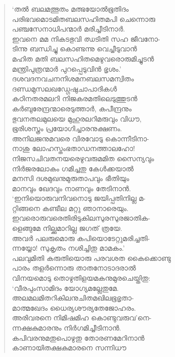 \begin{verse}
‘തല്‍ ബലമത്ഭുതം മത്ഭയോല്‍ഭൂതിദം\\
പരിഭവമൊടമിതബലസഹിതമപി ചെന്നൊരു\\
പഞ്ചസേനാധിപന്മാര്‍ മരിച്ചീടിനാര്‍.\\
ഇവനെ മമ നികടഭുവി ഝടിതി സഹ ജീവനോ-\\
ടിന്നു ബന്ധിച്ചു കൊണ്ടന്നു വെച്ചീടുവാന്‍\\
മഹിത മതി ബലസഹിതമെഴുവരൊരുമിച്ചുടന്‍\\
മന്ത്രിപുത്രന്മാര്‍ പുറപ്പെടുവിന്‍ ഭൃശം.’\\
ദശവദനവചനനിശമനബലസമന്വിതം\\
ദണ്ഡമുസലഖഡ്ഗേഷുചാപാദികള്‍\\
കഠിനതരമലറി നിജകരമതിലെടുത്തുടന്‍\\
കര്‍ബുരേന്ദ്രന്മാരെടുത്താര്‍, കപീന്ദ്രനും\\
ഭുവനതലമുലയെ മുഹുരലറിമരുവും വിധൗ,\\
ഭൂരിശസ്ത്രം പ്രയോഗിച്ചാരനുക്ഷണം.\\
അനിലജനുമവരെ വിരവോടു കൊന്നീടിനാ-\\
നാശു ലോഹസ്തംഭതാഡനത്താലഹോ!\\
നിജസചിവതനയരെഴുവരുമമിത സൈന്യവും\\
നിര്‍ജരലോകം ഗമിച്ചതു കേള്‍ക്കയാല്‍\\
മനസി ദശമുഖനുമുരുതാപവും ഭീതിയും\\
മാനവും ഖേദവും നാണവും തേടിനാന്‍.\\
‘ഇനിയൊരുവനിവനൊടു ജയിപ്പതിനില്ല മ-\\
റ്റിങ്ങനെ കണ്ടീല മറ്റു ഞാനാരെയും.\\
ഇവരൊരുവരെതിരിടുകിലസുരസുരജാതിക-\\
ളെങ്ങുമേ നില്ക്കുമാറില്ല ജഗത് ത്രയേ.\\
അവര്‍ പലരുമൊരു കപിയൊടേറ്റുമരിച്ചതി-\\
ന്നയ്യോ! സുകൃതം നശിച്ചിതു മാമകം.’\\
പലവുമിതി കരുതിയൊരു പരവശത കൈക്കൊണ്ടു\\
പാരം തളര്‍ന്നൊരു താതനോടാദരാല്‍\\
വിനയമൊടു തൊഴുതിളയമകനുമുരചെയ്തിതു:\\
‘വീരപുംസാമിദം യോഗ്യമല്ലേതുമേ.\\
അലമലമിതറികിലനുചിതമഖിലഭൂഭൃതാ-\\
മാത്മഖേദം ധൈര്യശൗര്യതേജോഹരം.\\
അരിവരനെ നിമിഷമിഹ കൊണ്ടുവരുവ’നെ-\\
ന്നക്ഷകുമാരനും നിര്‍ഗമിച്ചീടിനാന്‍.\\
കപിവരനുമതുപൊഴുതു തോരണമേറിനാന്‍\\
കാണായിതക്ഷകുമാരനെ സന്നിധൗ\\

\end{verse}
